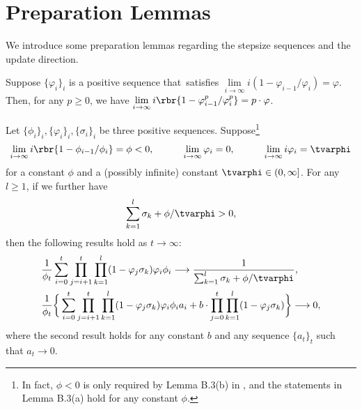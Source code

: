 \section{Preparation Lemmas}\label{appen:A1}

We introduce some preparation lemmas regarding the stepsize sequences and the update direction.

\begin{lemma}\label{aux:lem3}
 Suppose $\{\varphi_i\}_i$ is a positive sequence that~satisfies $\lim\limits_{i\rightarrow\infty}i(1 - \varphi_{i-1}/\varphi_i) = \varphi$. Then, for any $p \geq 0$, we have $\lim\limits_{i\rightarrow\infty}i\rbr{1 - \varphi_{i-1}^p/\varphi_i^p} = p\cdot \varphi$.
\end{lemma}

\begin{lemma}\label{aux:lem1}
Let $\{\phi_i\}_i,\{\varphi_i\}_i,\{\sigma_i\}_i$ be three positive sequences. Suppose\footnote{In fact, $\phi<0$ is only required by Lemma B.3(b) in \cite{Na2022Statistical}, and the statements in Lemma B.3(a) hold for any constant $\phi$.}
\begin{equation}\label{appen:A1:cond1}
\lim\limits_{i\rightarrow \infty} i\rbr{1 - \phi_{i-1}/\phi_i} = \phi<0,\quad \quad\quad\lim\limits_{i\rightarrow\infty}\varphi_i = 0, \quad\quad\quad \lim\limits_{i\rightarrow \infty} i\varphi_i = \tvarphi
\end{equation}
for a constant $\phi$ and a (possibly infinite) constant $\tvarphi \in(0, \infty]$. For any $l\geq 1$, if we further have 
\begin{equation}\label{appen:A1:cond2}
\sum_{k=1}^{l}\sigma_k + \phi/\tvarphi>0,
\end{equation}
then the following results hold as $t\rightarrow \infty$:
\begin{align}
& \frac{1}{\phi_t}\sum_{i=0}^{t}\prod_{j = i+1}^t\prod_{k=1}^{l}(1-\varphi_j\sigma_k)\varphi_i\phi_i \longrightarrow \frac{1}{\sum_{k=1}^{l}\sigma_k + \phi/\tvarphi},\label{appen:A1:equ1a}\\
& \frac{1}{\phi_t}\bigg\{\sum_{i=0}^{t}\prod_{j = i+1}^t\prod_{k=1}^{l}(1-\varphi_j\sigma_k)\varphi_i\phi_i a_i + b\cdot \prod_{j = 0}^t\prod_{k=1}^{l}(1-\varphi_j\sigma_k) \bigg\}  \longrightarrow 0,\label{appen:A1:equ1b}
\end{align}
where the second result holds for any constant $b$ and any sequence $\{a_t\}_t$ such that $a_t\rightarrow 0$.
\end{lemma}


